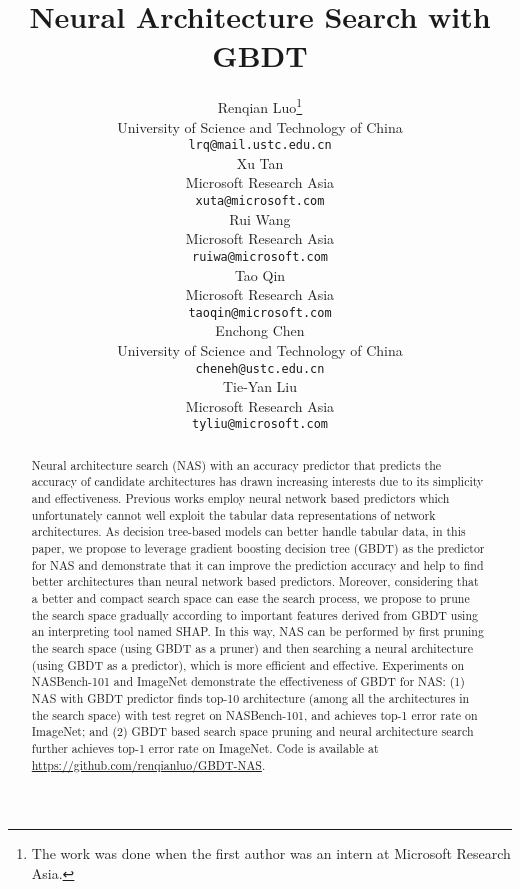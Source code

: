 \documentclass{article}
\title{Neural Architecture Search with GBDT}
\author{Renqian Luo\thanks{The work was done when the first author was an intern at Microsoft Research Asia.} \\
  University of Science and Technology of China\\
  \texttt{lrq@mail.ustc.edu.cn} \\
  \And
  Xu Tan\\
  Microsoft Research Asia \\
  \texttt{xuta@microsoft.com} \\
  \And
  Rui Wang\\
  Microsoft Research Asia \\
  \texttt{ruiwa@microsoft.com} \\
  \And
  Tao Qin\\
  Microsoft Research Asia \\
  \texttt{taoqin@microsoft.com} \\
  \And
  Enchong Chen\\
  University of Science and Technology of China \\
  \texttt{cheneh@ustc.edu.cn} \\
  \And
  Tie-Yan Liu \\
  Microsoft Research Asia \\
  \texttt{tyliu@microsoft.com} \\
}
\begin{document}
\maketitle

\begin{abstract}
Neural architecture search (NAS) with an accuracy predictor that predicts the accuracy of candidate architectures has drawn increasing interests due to its simplicity and effectiveness. Previous works employ neural network based predictors which unfortunately cannot well exploit the tabular data representations of network architectures. As decision tree-based models can better handle tabular data, in this paper, we propose to leverage gradient boosting decision tree (GBDT) as the predictor for NAS and demonstrate that it can improve the prediction accuracy and help to find better architectures than neural network based predictors. Moreover, considering that a better and compact search space can ease the search process, we propose to prune the search space gradually according to important features derived from GBDT using an interpreting tool named SHAP. In this way, NAS can be performed by first pruning the search space (using GBDT as a pruner) and then searching a neural architecture (using GBDT as a predictor), which is more efficient and effective. Experiments on NASBench-101 and ImageNet demonstrate the effectiveness of GBDT for NAS: (1) NAS with GBDT predictor finds top-10 architecture (among all the architectures in the search space) with  test regret on NASBench-101, and achieves  top-1 error rate on ImageNet; and (2) GBDT based search space pruning and neural architecture search further achieves  top-1 error rate on ImageNet. Code is available at \url{https://github.com/renqianluo/GBDT-NAS}.
\end{abstract}
\end{document}
